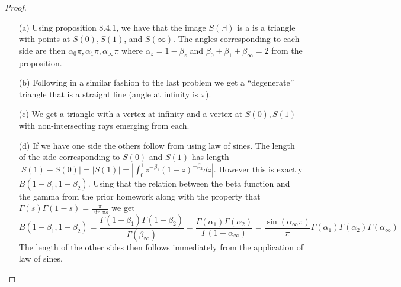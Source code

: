 \documentclass[10pt]{article}
\newcommand{\sk}{\vskip 10mm}
\newcommand{\bb}[1]{\mathbb{#1}}
\theoremstyle{remark}
\theoremstyle{remark}
\begin{document}
\begin{proof}
  \begin{enumerate}
  \item[(a)] Using proposition 8.4.1, we have that the image $S(\bb{H})$ is a
    is a triangle with points at $S(0),S(1)$, and $S(\infty)$. The angles corresponding
    to each side are then $\alpha_0\pi,\alpha_1\pi,\alpha_\infty\pi$ where $\alpha_z=1-\beta_z$ and $\beta_0+\beta_1+\beta_\infty=2$ from
    the proposition.
  \item[(b)] Following in a similar fashion to the last problem we
    get a ``degenerate'' triangle that is a straight line (angle at infinity is $\pi$).
  \item[(c)] We get a triangle with a vertex at infinity and a vertex at $S(0),S(1)$ with
    non-intersecting rays emerging from each.
  \item[(d)] If we have one side the others follow from using law of sines. The length
    of the side corresponding to $S(0)$ and $S(1)$ has length $|S(1)-S(0)|=|S(1)|=|\int_0^1 z^{-\beta_1}(1-z)^{-\beta_2}dz|$.
    However this is exactly $B(1-\beta_1,1-\beta_2)$. Using that the relation between the
    beta function and the gamma from the prior homework along with the property
    that $\Gamma(s)\Gamma(1-s)=\frac{\pi}{\sin\pi s}$ we get
    \[
      B(1-\beta_1,1-\beta_2)=\frac{\Gamma(1-\beta_1)\Gamma(1-\beta_2)}{\Gamma(\beta_\infty)}=\frac{\Gamma(\alpha_1)\Gamma(\alpha_2)}{\Gamma(1-\alpha_\infty)}=\frac{\sin(\alpha_\infty\pi)}{\pi}\Gamma(\alpha_1)\Gamma(\alpha_2)\Gamma(\alpha_\infty)
    \]
    The length of the other sides then follows immediately from the application of
    law of sines.
  \end{enumerate}
\end{proof}

\sk
\end{document}
